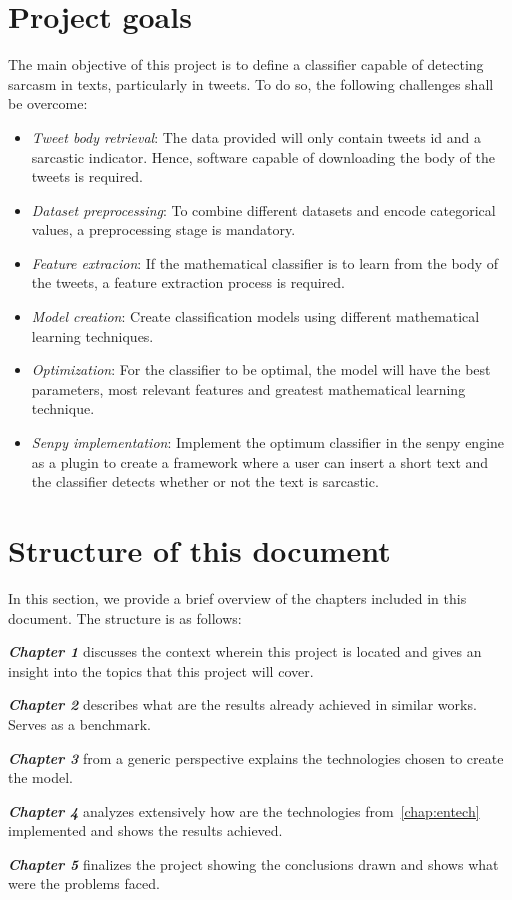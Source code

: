 \section{Project goals}
The main objective of this project is to define a classifier capable of detecting sarcasm in texts, particularly in tweets. To do so, the following challenges shall be overcome:

\begin{itemize}

\item  \textit{Tweet body retrieval}: The data provided will only contain tweets id and a sarcastic indicator. Hence, software capable of downloading the body of the tweets is required.
\item \textit{Dataset preprocessing}: To combine different datasets and encode categorical values, a preprocessing stage is mandatory.
\item \textit{Feature extracion}: If the mathematical classifier is to learn from the body of the tweets, a feature extraction process is required.
\item \textit{Model creation}: Create classification models using different mathematical learning techniques.
\item \textit{Optimization}: For the classifier to be optimal, the model will have the best parameters, most relevant features and greatest mathematical learning technique.
\item \textit{Senpy implementation}: Implement the optimum classifier in the senpy engine as a plugin to create a framework where a user can insert a short text and the classifier detects whether or not the text is sarcastic.

\end{itemize}

\section{Structure of this document}
In this section, we provide a brief overview of the chapters included in this document. The structure is as follows:

\textbf{\textit{Chapter 1}} discusses the context wherein this project is located and gives an insight into the topics that this project will cover.

\textbf{\textit{Chapter 2}} describes what are the results already achieved in similar works. Serves as a benchmark.

\textbf{\textit{Chapter 3}} from a generic perspective explains the technologies chosen to create the model.

\textbf{\textit{Chapter 4}} analyzes extensively how are the technologies from~\cref{chap:entech} implemented and shows the results achieved.

\textbf{\textit{Chapter 5}} finalizes the project showing the conclusions drawn and shows what were the problems faced.
